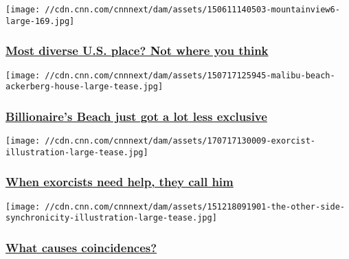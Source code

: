 \href{/2015/06/12/us/most-diverse-place-in-america/index.html}{}

\texttt{[image: //cdn.cnn.com/cnnnext/dam/assets/150611140503-mountainview6-large-169.jpg]}

\hypertarget{most-diverse-us-place-not-where-you-think}{%
\subsubsection{\texorpdfstring{\href{/2015/06/12/us/most-diverse-place-in-america/index.html}{Most
diverse U.S. place? Not where you
think}}{Most diverse U.S. place? Not where you think}}\label{most-diverse-us-place-not-where-you-think}}

\href{/2015/07/17/us/billionaires-beach-malibu-public-access/index.html}{}

\texttt{[image: //cdn.cnn.com/cnnnext/dam/assets/150717125945-malibu-beach-ackerberg-house-large-tease.jpg]}

\hypertarget{billionaires-beach-just-got-a-lot-less-exclusive}{%
\subsubsection{\texorpdfstring{\href{/2015/07/17/us/billionaires-beach-malibu-public-access/index.html}{Billionaire's
Beach just got a lot less
exclusive}}{Billionaire's Beach just got a lot less exclusive}}\label{billionaires-beach-just-got-a-lot-less-exclusive}}

\href{/2017/08/04/health/exorcism-doctor/index.html}{}

\texttt{[image: //cdn.cnn.com/cnnnext/dam/assets/170717130009-exorcist-illustration-large-tease.jpg]}

\hypertarget{when-exorcists-need-help-they-call-him}{%
\subsubsection{\texorpdfstring{\href{/2017/08/04/health/exorcism-doctor/index.html}{When
exorcists need help, they call
him}}{When exorcists need help, they call him}}\label{when-exorcists-need-help-they-call-him}}

\href{/2015/12/29/us/odd-coincidences-synchronicity-the-other-side/index.html}{}

\texttt{[image: //cdn.cnn.com/cnnnext/dam/assets/151218091901-the-other-side-synchronicity-illustration-large-tease.jpg]}

\hypertarget{what-causes-coincidences}{%
\subsubsection{\texorpdfstring{\href{/2015/12/29/us/odd-coincidences-synchronicity-the-other-side/index.html}{What
causes
coincidences?}}{What causes coincidences?}}\label{what-causes-coincidences}}

